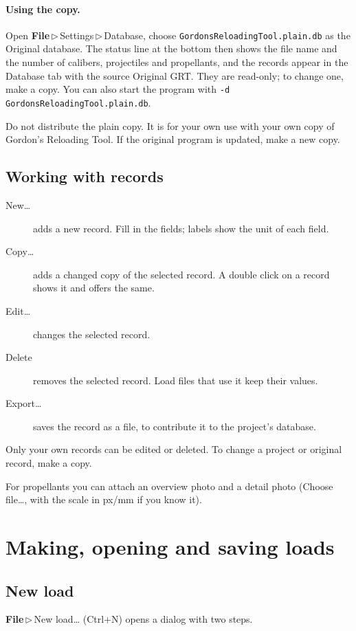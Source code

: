 \documentclass[11pt,a4paper]{article}
\newcommand{\ui}[1]{\textsf{#1}}
\newcommand{\menu}[1]{\textsf{\textbf{#1}}}
\newcommand{\sep}{\,$\triangleright$\,}
\newcommand{\file}[1]{\texttt{#1}}
\begin{document}
\paragraph{Using the copy.} Open \menu{File}\sep\ui{Settings}\sep\ui{Database}, choose \file{GordonsReloadingTool.plain.db} as the \ui{Original database}.
The status line at the bottom then shows the file name and the number of calibers, projectiles and propellants, and the records appear in the \ui{Database} tab with
the source \ui{Original GRT}. They are read-only; to change one, make a copy. You can also start the program with \texttt{-d GordonsReloadingTool.plain.db}.

\begin{note}
Do not distribute the plain copy. It is for your own use with your own copy of Gordon's Reloading Tool. If the original program is updated, make a new copy.
\end{note}

\subsection{Working with records}
\begin{description}
  \item[New\dots] adds a new record. Fill in the fields; labels show the unit of each field.
  \item[Copy\dots] adds a changed copy of the selected record. A double click on a record shows it and offers the same.
  \item[Edit\dots] changes the selected record.
  \item[Delete] removes the selected record. Load files that use it keep their values.
  \item[Export\dots] saves the record as a file, to contribute it to the project's database.
\end{description}
Only your own records can be edited or deleted. To change a project or original record, make a copy.

For propellants you can attach an overview photo and a detail photo (\ui{Choose file\dots}, with the scale in px/mm if you know it).

\section{Making, opening and saving loads}\label{sec:files}

\subsection{New load}
\menu{File}\sep\ui{New load\dots} (Ctrl+N) opens a dialog with two steps.
\end{document}
